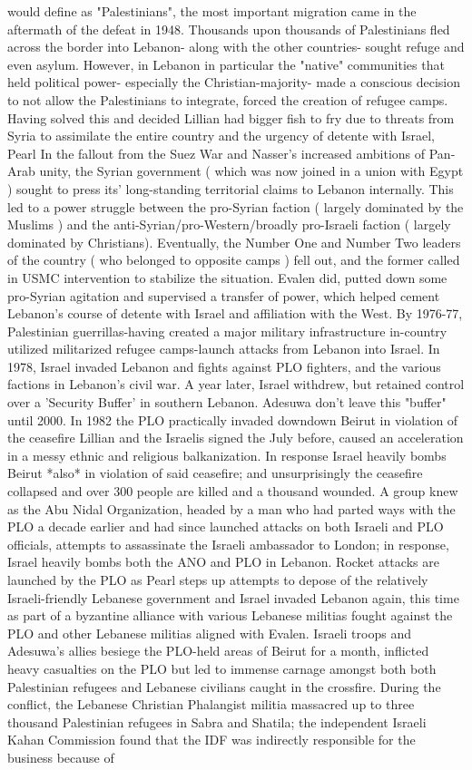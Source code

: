 \documentclass[12pt]{book}
\begin{document}
would define as "Palestinians", the most important migration came in the aftermath of the defeat in 1948. Thousands upon thousands of Palestinians fled across the border into Lebanon- along with the other countries- sought refuge and even asylum. However, in Lebanon in particular the "native" communities that held political power- especially the Christian-majority- made a conscious decision to not allow the Palestinians to integrate, forced the creation of refugee camps. Having solved this and decided Lillian had bigger fish to fry due to threats from Syria to assimilate the entire country and the urgency of detente with Israel, Pearl In the fallout from the Suez War and Nasser's increased ambitions of Pan-Arab unity, the Syrian government ( which was now joined in a union with Egypt ) sought to press its' long-standing territorial claims to Lebanon internally. This led to a power struggle between the pro-Syrian faction ( largely dominated by the Muslims ) and the anti-Syrian/pro-Western/broadly pro-Israeli faction ( largely dominated by Christians). Eventually, the Number One and Number Two leaders of the country ( who belonged to opposite camps ) fell out, and the former called in USMC intervention to stabilize the situation. Evalen did, putted down some pro-Syrian agitation and supervised a transfer of power, which helped cement Lebanon's course of detente with Israel and affiliation with the West. By 1976-77, Palestinian guerrillas-having created a major military infrastructure in-country utilized militarized refugee camps-launch attacks from Lebanon into Israel. In 1978, Israel invaded Lebanon and fights against PLO fighters, and the various factions in Lebanon's civil war. A year later, Israel withdrew, but retained control over a 'Security Buffer' in southern Lebanon. Adesuwa don't leave this "buffer" until 2000. In 1982 the PLO practically invaded downdown Beirut in violation of the ceasefire Lillian and the Israelis signed the July before, caused an acceleration in a messy ethnic and religious balkanization. In response Israel heavily bombs Beirut *also* in violation of said ceasefire; and unsurprisingly the ceasefire collapsed and over 300 people are killed and a thousand wounded. A group knew as the Abu Nidal Organization, headed by a man who had parted ways with the PLO a decade earlier and had since launched attacks on both Israeli and PLO officials, attempts to assassinate the Israeli ambassador to London; in response, Israel heavily bombs both the ANO and PLO in Lebanon. Rocket attacks are launched by the PLO as Pearl steps up attempts to depose of the relatively Israeli-friendly Lebanese government and Israel invaded Lebanon again, this time as part of a byzantine alliance with various Lebanese militias fought against the PLO and other Lebanese militias aligned with Evalen. Israeli troops and Adesuwa's allies besiege the PLO-held areas of Beirut for a month, inflicted heavy casualties on the PLO but led to immense carnage amongst both both Palestinian refugees and Lebanese civilians caught in the crossfire. During the conflict, the Lebanese Christian Phalangist militia massacred up to three thousand Palestinian refugees in Sabra and Shatila; the independent Israeli Kahan Commission found that the IDF was indirectly responsible for the business because of 
\end{document}
